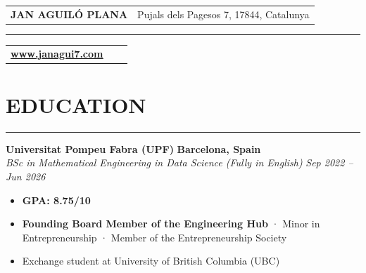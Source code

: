 \documentclass[a4paper,11pt]{article}
\newcommand{\sectionline}{
    \noindent\rule{\textwidth}{0.5pt} %
}
\newcommand{\cvname}[1]{\Large\textbf{#1}}
\newcommand{\cvsection}[1]{
    \section{#1} %
    \vspace{-1.0em} %
    \sectionline
}
\newenvironment{cvitemize}
  {\begin{itemize}}
  {\end{itemize}\vspace{0.8em}} %
\begin{document}
\noindent
\begin{tabularx}{\textwidth}{@{}X r@{}}
    \cvname{JAN AGUILÓ PLANA} & {\small Pujals dels Pagesos 7, 17844, Catalunya} \\
\end{tabularx}
\vspace{-1.5em} %

\noindent\rule{\textwidth}{1pt}

\noindent
\begin{tabularx}{\textwidth}{@{}l X r@{}}
     {\rmfamily \href{www.janagui7.com}{\textbf{\underline{www.janagui7.com}}} }\\
\end{tabularx}
\vspace{0em} %

\cvsection{EDUCATION}
\textbf{Universitat Pompeu Fabra (UPF)} \hfill \textbf{Barcelona, Spain} \\
\textit{BSc in Mathematical Engineering in Data Science (Fully in English)} \hfill \textit{Sep 2022 -- Jun 2026} \\
\vspace{-1em} %
\begin{cvitemize}
    \item \textbf{GPA: 8.75/10}
    \item \textbf{Founding Board Member of the Engineering Hub} · Minor in Entrepreneurship · Member of the Entrepreneurship Society
    \item Exchange student at University of British Columbia (UBC)
\end{cvitemize}
\vspace{0.3em} %



\end{document}
